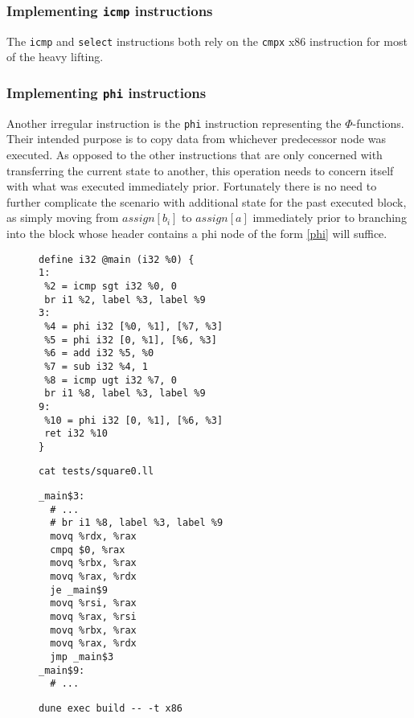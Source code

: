 \documentclass{article}
\begin{document}
\subsubsection{Implementing \texttt{icmp} instructions} \label{impl-cond}
The \texttt{icmp} and \texttt{select} instructions both rely on the \texttt{cmpx} x86 instruction for most of the heavy lifting.

\subsubsection{Implementing \texttt{phi} instructions}\label{impl-phi}
Another irregular instruction is the \texttt{phi} instruction representing the \(\Phi\)-functions. Their  intended purpose is to copy data from whichever predecessor node was executed.
As opposed to the other instructions that are only concerned with transferring the current state to another, this operation needs to concern itself with what was executed immediately prior.
Fortunately there is no need to further complicate the scenario with additional state for the past executed block, as simply moving from \(\mathit{assign}[b_i]\) to \(\mathit{assign}[a]\) immediately prior to branching into the block whose header contains a phi node of the form \eqref{phi} will suffice.

\begin{figure}[H]
   \begin{minipage}{0.48\textwidth}
     \centering
     \begin{verbatim}
define i32 @main (i32 %0) {
1:
 %2 = icmp sgt i32 %0, 0
 br i1 %2, label %3, label %9
3:
 %4 = phi i32 [%0, %1], [%7, %3]
 %5 = phi i32 [0, %1], [%6, %3]
 %6 = add i32 %5, %0
 %7 = sub i32 %4, 1
 %8 = icmp ugt i32 %7, 0
 br i1 %8, label %3, label %9
9:
 %10 = phi i32 [0, %1], [%6, %3]
 ret i32 %10
}
     \end{verbatim}
     \caption{\texttt{cat tests/square0.ll}}\label{fig:square0ll}
   \end{minipage}\hfill
   \begin{minipage}{0.48\textwidth}
     \centering
     \begin{verbatim}
_main$3:
  # ...
  # br i1 %8, label %3, label %9
  movq %rdx, %rax
  cmpq $0, %rax
  movq %rbx, %rax
  movq %rax, %rdx
  je _main$9
  movq %rsi, %rax
  movq %rax, %rsi
  movq %rbx, %rax
  movq %rax, %rdx
  jmp _main$3
_main$9:
  # ...
     \end{verbatim}
     \caption{\texttt{dune exec build -{}- -t x86}}\label{fig:square0s}
   \end{minipage}
\end{figure}
\end{document}
